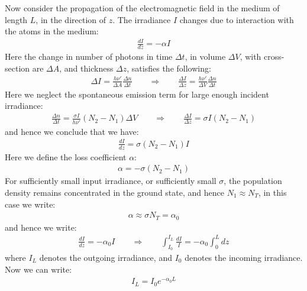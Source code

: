 \documentclass[11pt]{book}
\theoremstyle{break}
\theoremstyle{break}
\begin{document}
Now consider the propagation of the electromagnetic field in the medium of length $L$, in the direction of $z$. The irradiance $I$ changes due to interaction with the atoms in the medium:
\begin{align*}
\frac{dI}{dz} = -\alpha I
\end{align*}
Here the change in number of photons in time $\Delta t$, in volume $\Delta V$, with cross-section are $\Delta A$, and thickness $\Delta z$, satisfies the following:
\begin{align*}
\Delta I = \frac{h\nu'}{\Delta A} \frac{\Delta n}{\Delta t} \qquad \Rightarrow\qquad \frac{\Delta I}{\Delta z} = \frac{h\nu'}{\Delta V}\frac{\Delta n}{\Delta t}
\end{align*}
Here we neglect the spontaneous emission term for large enough incident irradiance:
\begin{align*}
\frac{\Delta n}{\Delta t} = \frac{\sigma I}{h\nu'}(N_2 - N_1) \Delta V \qquad \Rightarrow \qquad \frac{\Delta I}{\Delta z} =\sigma I (N_2 - N_1) 
\end{align*}
and hence we conclude that we have:
\begin{align*}
\frac{dI}{dz} = \sigma(N_2 - N_1) I
\end{align*}
Here we define the loss coefficient $\alpha$:
\begin{align*}
\alpha = -\sigma(N_2 - N_1)
\end{align*}
For sufficiently small input irradiance, or sufficiently small $\sigma$, the population density remains concentrated in the ground state, and hence $N_1 \approx N_T$, in this case we write:
\begin{align*}
\alpha \approx \sigma N_T = \alpha_0
\end{align*}
and hence we write:
\begin{align*}
\frac{dI}{dz} = -\alpha_0 I \tag{small input irradiance} \qquad \Rightarrow \qquad \int_{I_0}^{I_L}\frac{dI}{I} = -\alpha_0 \int_0^L dz
\end{align*}
where $I_L$ denotes the outgoing irradiance, and $I_0$ denotes the incoming irradiance. Now we can write:
\begin{align*}
I_L = I_0 e^{-\alpha_0 L} \tag{Beer's Law}
\end{align*}
\newpage
\end{document}
